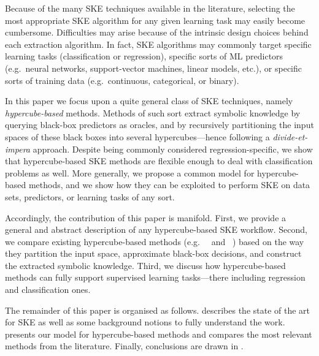 \documentclass[
]{ceurart}
\begin{document}
Because of the many SKE techniques available in the literature, selecting the most appropriate SKE algorithm for any given learning task may easily become cumbersome.
%
Difficulties may arise because of the intrinsic design choices behind each extraction algorithm.
%
In fact, SKE algorithms may commonly target specific learning tasks (classification or regression), specific sorts of ML predictors (e.g.\ neural networks, support-vector machines, linear models, etc.), or specific sorts of training data (e.g.\ continuous, categorical, or binary).

In this paper we focus upon a quite general class of SKE techniques, namely \emph{hypercube-based} methods.
%
Methods of such sort extract symbolic knowledge by querying black-box predictors as oracles, and by recursively partitioning the input spaces of these black boxes into several hypercubes---hence following a \emph{divide-et-impera} approach.
%
Despite being commonly considered regression-specific, we show that hypercube-based SKE methods are flexible enough to deal with classification problems as well.
%
More generally, we propose a common model for hypercube-based methods, and we show how they can be exploited to perform SKE on data sets, predictors, or learning tasks of any sort.

Accordingly, the contribution of this paper is manifold.
%
First, we provide a general and abstract description of any hypercube-based SKE workflow.
%
Second, we compare existing hypercube-based methods (e.g.\ \iter{}~\cite{huysmans2006iter} and \gridex{}~\cite{gridex-extraamas2021}) based on the way they partition the input space, approximate black-box decisions, and construct the extracted symbolic knowledge.
%
Third, we discuss how hypercube-based methods can fully support supervised learning tasks---there including regression and classification ones.
%

The remainder of this paper is organised as follows.
%
 describes the state of the art for SKE as well as some background notions to fully understand the work.
%
 presents our model for hypercube-based methods and compares the most relevant methods from the literature. %
%
Finally, conclusions are drawn in .
\end{document}
